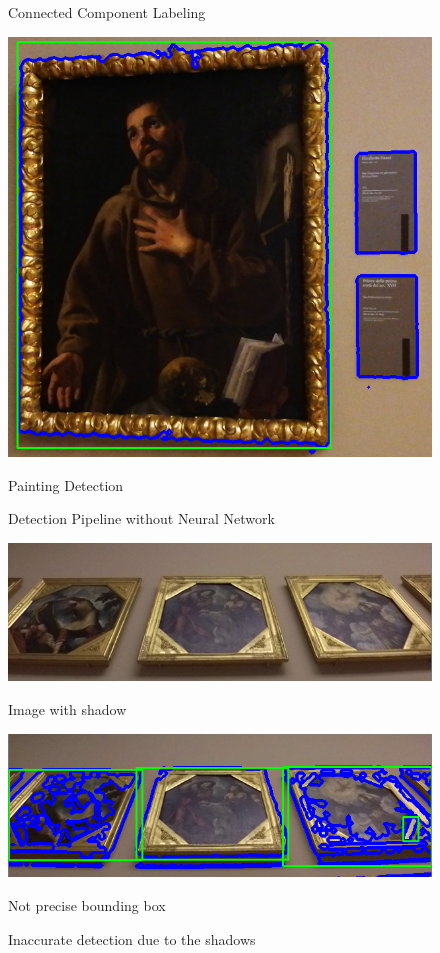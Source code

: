 \begin{figure}[h]
      \caption*{Connected Component Labeling}\label{fig:ccl}
    \endminipage\hfill
      \includegraphics[width=\linewidth]{pictures/painting_detection/6-bbox.PNG}
      \caption*{Painting Detection}\label{fig:bbox}
    \endminipage
    \caption{Detection Pipeline without Neural Network} \label{fig:pipeline_detection}
\end{figure}

\begin{figure}[h]
      \includegraphics[width=\linewidth]{pictures/painting_detection/shadow1.PNG}
      \caption*{Image with shadow}\label{fig:shadow1}
    \endminipage\hfill
      \includegraphics[width=\linewidth]{pictures/painting_detection/shadow2.PNG}
      \caption*{Not precise bounding box}\label{fig:shadow2}
    \endminipage\hfill
    \caption{Inaccurate detection due to the shadows}\label{fig:innaccurate_detection}
\end{figure}







